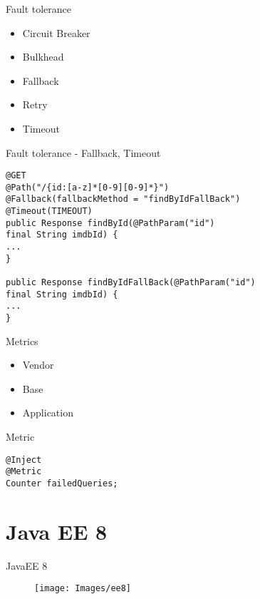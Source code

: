 \documentclass{beamer}
\begin{document}
\begin{frame}{Fault tolerance}

\begin{itemize}
	\item Circuit Breaker
	\item Bulkhead
	\item Fallback
	\item Retry
	\item Timeout
\end{itemize}

\end{frame}


\begin{frame}[fragile]{Fault tolerance - Fallback, Timeout}
\begin{lstlisting}
@GET
@Path("/{id:[a-z]*[0-9][0-9]*}")
@Fallback(fallbackMethod = "findByIdFallBack")
@Timeout(TIMEOUT)
public Response findById(@PathParam("id") 
final String imdbId) {
...
}

public Response findByIdFallBack(@PathParam("id") 
final String imdbId) {
...
}
\end{lstlisting}
\end{frame}


\begin{frame}{Metrics}

\begin{itemize}
	\item Vendor
	\item Base
	\item Application
\end{itemize}

\end{frame}

\begin{frame}[fragile]{Metric}
\begin{lstlisting}
@Inject
@Metric
Counter failedQueries;
\end{lstlisting}
\end{frame}



\section{Java EE 8}
\begin{frame}{JavaEE 8}
\begin{figure}
	\centering
	\texttt{[image: Images/ee8]}
\end{figure}
\end{frame}
\end{document}
